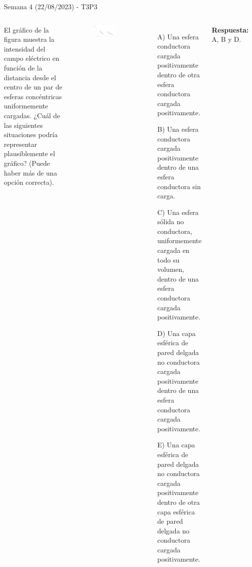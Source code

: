 \begin{frame}{Semana 4 (22/08/2023) - T3P3}
    \begin{columns}
    \footnotesize
    
    El gráfico de la figura muestra la intensidad del campo eléctrico en función de la distancia desde el centro de un par de esferas concéntricas uniformemente cargadas. 
    ¿Cuál de las siguientes situaciones podría representar plausiblemente el gráfico? (Puede haber más de una opción correcta).
    \vspace{-2em}
    \begin{figure}
        \centering
        \includegraphics[scale=0.2]{figures/t3p3.png}
    \end{figure}
    \vspace{-2em}
    \begin{itemize}
        \item[A)] Una esfera conductora cargada positivamente dentro de otra esfera conductora cargada positivamente.
        \item[B)] Una esfera conductora cargada positivamente dentro de una esfera conductora sin carga.
        \item[C)] Una esfera sólida no conductora, uniformemente cargada en todo su volumen, dentro de una esfera conductora cargada positivamente.
        \item[D)] Una capa esférica de pared delgada no conductora cargada positivamente dentro de una esfera conductora cargada positivamente.
        \item[E)] Una capa esférica de pared delgada no conductora cargada positivamente dentro de otra capa esférica de pared delgada no conductora cargada positivamente.
    \end{itemize}
    \pause \centering\textbf{Respuesta:} A, B y D.
    
    \end{columns}

\end{frame}

